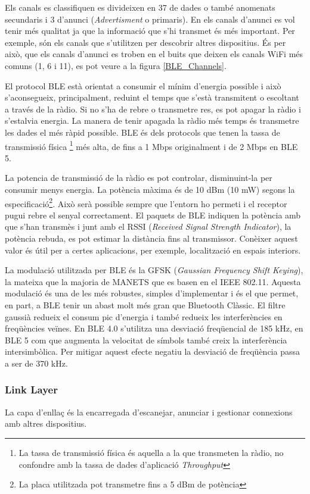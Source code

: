 Els canals es classifiquen es divideixen en 37 de dades o també anomenats secundaris i 3 d'anunci (\textit{Advertisment} o primaris).
En els canals d'anunci es vol tenir més qualitat ja que la informació que s'hi transmet és més important.
Per exemple, són els canals que s'utilitzen per descobrir altres dispositius.
És per això, que els canals d'anunci es troben en el buits que deixen els canals WiFi més comuns (1, 6 i 11), es pot veure a la figura \ref{BLE_Channels}.

El protocol BLE està orientat a consumir el mínim d'energia possible i això s'aconsegueix, principalment, reduint el temps que s'està transmitent o escoltant a través de la ràdio.
Si no s'ha de rebre o transmetre res, es pot apagar la ràdio i s'estalvia energia.
La manera de tenir apagada la ràdio més temps és transmetre les dades el més ràpid possible.
BLE és dels protocols que tenen la tassa de transmissió física \footnote{La tassa de transmissió física és aquella a la que transmeten la ràdio, no confondre amb la tassa de dades d'aplicació \textit{Throughput}} més alta, de fins a 1 Mbps originalment i de 2 Mbps en BLE 5.

La potencia de transmissió de la ràdio es pot controlar, disminuint-la per consumir menys energia.
La potència màxima és de 10 dBm (10 mW) segons la especificació\footnote{La placa utilitzada pot transmetre fins a 5 dBm de potència}.
Això serà possible sempre que l'entorn ho permeti i el receptor pugui rebre el senyal correctament.
El paquets de BLE indiquen la potència amb que s'han transmès i junt amb el RSSI (\textit{Received Signal Strength Indicator}), la potència rebuda, es pot estimar la distància fins al transmissor.
Conèixer aquest valor és útil per a certes aplicacions, per exemple, localització en espais interiors.

La modulació utilitzada per BLE és la GFSK (\textit{Gaussian Frequency Shift Keying}), la mateixa que la majoria de MANETS que es basen en el IEEE 802.11.
Aquesta modulació és una de les més robustes, simples d'implementar i és el que permet, en part, a BLE tenir un abast molt més gran que Bluetooth Clàssic.
El filtre gaussià redueix el consum pic d'energia \cite{BLE_Review} i també redueix les interferències en freqüències veïnes.
En BLE 4.0 s'utilitza una desviació freqüencial de 185 kHz, en BLE 5 com que augmenta la velocitat de símbols també creix la interferència intersimbòlica.
Per mitigar aquest efecte negatiu la desviació de freqüència passa a ser de 370 kHz.


\subsubsection{Link Layer}
La capa d'enllaç és la encarregada d'escanejar, anunciar i gestionar connexions amb altres dispositius.

